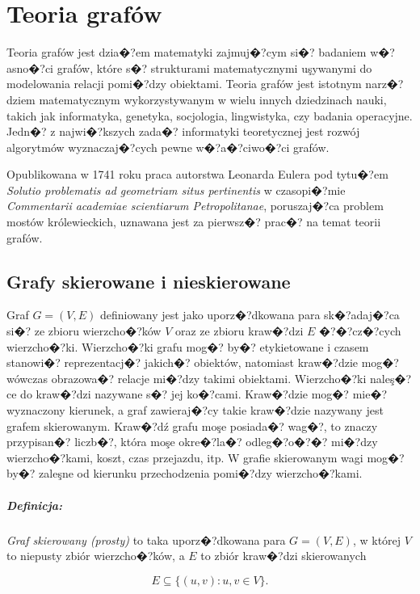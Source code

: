 \documentclass[12pt,a4paper]{mwrep}
\begin{document}
\chapter{Teoria grafów}
\label{ch:teoria_grafow}

Teoria grafów jest dzia�?em matematyki zajmuj�?cym si�? badaniem w�?asno�?ci grafów,
które s�? strukturami matematycznymi uşywanymi do modelowania relacji
pomi�?dzy obiektami. Teoria grafów jest istotnym narz�?dziem matematycznym
wykorzystywanym w wielu innych dziedzinach nauki, takich jak
informatyka, genetyka, socjologia, lingwistyka, czy badania operacyjne.
Jedn�? z najwi�?kszych zada�? informatyki teoretycznej jest rozwój algorytmów 
wyznaczaj�?cych pewne w�?a�?ciwo�?ci grafów.

Opublikowana w 1741 roku praca autorstwa Leonarda Eulera pod tytu�?em 
\emph{Solutio problematis ad geometriam situs pertinentis}
w czasopi�?mie \emph{Commentarii academiae scientiarum Petropolitanae}, 
poruszaj�?ca problem mostów królewieckich, uznawana jest za pierwsz�?
prac�? na temat teorii grafów.

\section{Grafy skierowane i nieskierowane}

Graf $G=(V,E)$ definiowany jest jako uporz�?dkowana para sk�?adaj�?ca si�? 
ze zbioru wierzcho�?ków $V$ oraz ze zbioru kraw�?dzi $E$ �?�?cz�?cych wierzcho�?ki.
Wierzcho�?ki grafu mog�? by�? etykietowane i czasem stanowi�? reprezentacj�? 
jakich�? obiektów, natomiast kraw�?dzie mog�? wówczas obrazowa�? relacje 
mi�?dzy takimi obiektami. Wierzcho�?ki naleş�?ce do kraw�?dzi nazywane s�? jej 
ko�?cami. Kraw�?dzie mog�? mie�? wyznaczony kierunek, a graf zawieraj�?cy takie 
kraw�?dzie nazywany jest grafem skierowanym. Kraw�?dź grafu moşe posiada�? 
wag�?, to znaczy przypisan�? liczb�?, która moşe okre�?la�? odleg�?o�?�? mi�?dzy 
wierzcho�?kami, koszt, czas przejazdu, itp. 
W grafie skierowanym wagi mog�? by�? zaleşne od kierunku 
przechodzenia pomi�?dzy wierzcho�?kami.

\paragraph{Definicja:} \emph{Graf skierowany (prosty)} to taka uporz�?dkowana
para $G=(V,E)$, w której $V$ to niepusty zbiór wierzcho�?ków, a $E$ to zbiór
kraw�?dzi skierowanych

\begin{equation}
E \subseteq \{ (u,v) : u,v \in V \}.
\end{equation}
\end{document}
